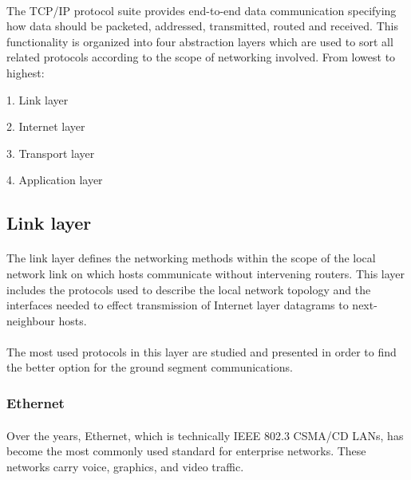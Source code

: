 \paragraph{}
The TCP/IP protocol suite provides end-to-end data communication specifying how data should be packeted, addressed, transmitted, routed and received. This functionality is organized into four abstraction layers which are used to sort all related protocols according to the scope of networking involved. From lowest to highest:
\begin{list}{}{}
\item 1. Link layer
\item 2. Internet layer
\item 3. Transport layer
\item 4. Application layer
\end{list}

\subsection{Link layer}
\paragraph{}
The link layer defines the networking methods within the scope of the local network link on which hosts communicate without intervening routers. This layer includes the protocols used to describe the local network topology and the interfaces needed to effect transmission of Internet layer datagrams to next-neighbour hosts. 
\paragraph{}
The most used protocols in this layer are studied and presented in order to find the better option for the ground segment communications.
\paragraph{}
\subsubsection{Ethernet}
\paragraph{}
Over the years, Ethernet, which is technically IEEE 802.3 CSMA/CD LANs, has become the most commonly used standard for enterprise networks. These networks carry voice, graphics, and video traffic.
